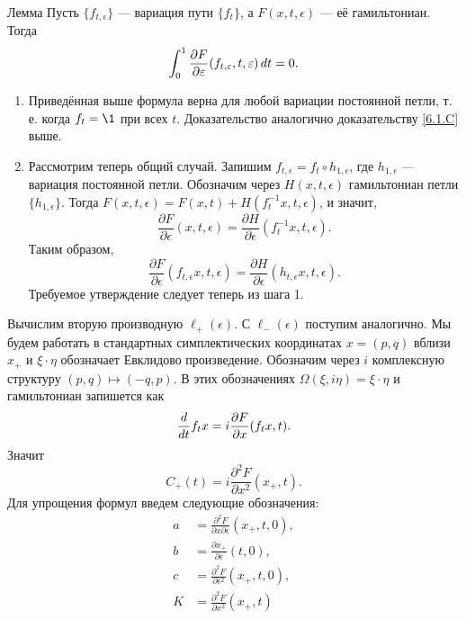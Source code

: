 \begin{thm}{Лемма}\label{12.4.B}
Пусть $\{f_{t,\epsilon}\}$ --- вариация пути $\{f_t\}$, а $F(x, t,\epsilon)$ --- её гамильтониан.
Тогда 
\[\int_0^1\frac{\partial F}{\partial \varepsilon}(f_{t,\varepsilon},t,\varepsilon)\,d t=0.\] 

\end{thm}

\begin{enumerate}[1)]
\item Приведённая выше формула верна для любой вариации постоянной петли, т. е. когда $f_t = \1$ при всех $t$.
Доказательство аналогично доказательству \ref{6.1.C} выше.
\item Рассмотрим теперь общий случай.
Запишим $f_{t,\epsilon} = f_t \circ h_{1,\epsilon}$, где $h_{1,\epsilon}$ --- вариация постоянной петли.
Обозначим через $H(x, t, \epsilon)$ гамильтониан петли $\{h_{1,\epsilon}\}$.
Тогда $F(x,t,\epsilon) = F(x,t) + H(f_t^{-1}x,t,\epsilon)$, и значит, 
\[\frac{\partial F}{\partial \epsilon}(x,t,\epsilon)=\frac{\partial H}{\partial \epsilon}(f_t^{-1}x,t,\epsilon).\]
Таким образом,
\[\frac{\partial F}{\partial \epsilon}(f_{t,\epsilon}x,t,\epsilon)=\frac{\partial H}{\partial \epsilon}(h_{t,\epsilon}x,t,\epsilon).\]
Требуемое утверждение следует теперь из шага 1.
\end{enumerate}


Вычислим вторую производную $\ell_+(\epsilon)$.
С $\ell_-(\epsilon)$ поступим аналогично.
Мы будем работать в стандартных симплектических координатах $x = (p, q)$ вблизи $x_+$ и $\xi\cdot\eta$ обозначает Евклидово  произведение.
Обозначим через $i$ комплексную структуру $(p, q) \mapsto (-q, p)$.
В этих обозначениях $\Omega(\xi, i\eta) = \xi\cdot\eta$ и гамильтониан запишется как
\[\frac{d}{d t}f_tx=i\frac{\partial F}{\partial x}(f_tx,t).\]
Значит
\[C_+(t)=i\frac{\partial^2F}{\partial x^2}(x_+,t).\]
Для упрощения формул введем следующие обозначения: 
\begin{align*}
a&=\frac{\partial^2 F}{\partial x\partial\epsilon}(x_+,t,0),
\\
b&=\frac{\partial x_+}{\partial\epsilon}(t,0),
\\
c&=\frac{\partial^2 F}{\partial\epsilon^2}(x_+,t,0),
\\
K&=\frac{\partial^2 F}{\partial x^2}(x_+,t)
\end{align*}

